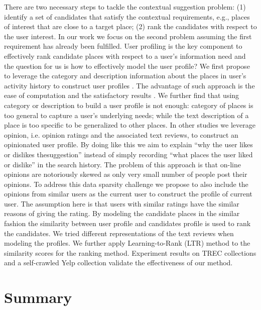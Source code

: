 There are two necessary steps to tackle the contextual suggestion problem: 
(1) identify a set of candidates that satisfy the contextual 
requirements, e.g., places of interest that are close to a target place; 
(2) rank the candidates with respect to the user interest. 
In our work we focus on the second problem assuming the first requirement 
has already been fulfilled. 
User profiling is the key component to effectively rank candidate places 
with respect to a user's information need and the question for us is how 
to effectively model the user profile? 
We first propose to leverage the category and description information about 
the places in user's activity history to construct user profiles \cite{udel:treccs2012}. 
The advantage of such approach is the ease of computation and the satisfactory 
results \cite{adriel:overview}. 
We further find that using category or description to build a user profile 
is not enough: category of places is too general to capture a user's 
underlying needs; while the text description of a place is too specific to 
be generalized to other places. In other studies \cite{udel:treccs2013,udel:treccs2014,udel:treccs2015,Yang:2013:OUP:2499178.2499191,Yang2015}
we leverage opinion, 
i.e. opinion ratings and the associated text reviews, to construct an 
opinionated user profile. By doing like this we aim to explain 
``why the user likes or dislikes thesuggestion'' instead of simply recording 
``what places the user liked or dislike'' in the search history. 
The problem of this approach is that on-line opinions are notoriously skewed 
as only very small number of people post their opinions. 
To address this data sparsity challenge we propose to also include the 
opinions from similar users as the current user to construct the profile of 
current user. The assumption here is that users with similar ratings have 
the similar reasons of giving the rating. By modeling the candidate places 
in the similar fashion the similarity between user profile and candidates 
profile is used to rank the candidates. We tried different representations 
of the text reviews when modeling the profiles. We further apply 
Learning-to-Rank (LTR) method to the similarity scores for the ranking method. 
Experiment results on TREC collections and a self-crawled Yelp collection 
validate the effectiveness of our method.


\section{Summary}

